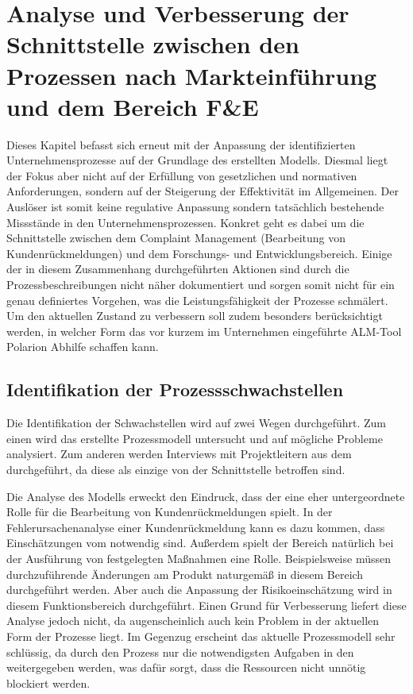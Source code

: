 \documentclass[a4paper,12pt]{report}
\begin{document}
\chapter{Analyse und Verbesserung der Schnittstelle zwischen den Prozessen nach Markteinführung und dem Bereich F\&E}\label{chap:Schnittstelle}
Dieses Kapitel befasst sich erneut mit der Anpassung der identifizierten Unternehmensprozesse auf der Grundlage des erstellten Modells. Diesmal liegt der Fokus aber nicht auf der Erfüllung von gesetzlichen und normativen Anforderungen, sondern auf der Steigerung der Effektivität im Allgemeinen. Der Auslöser ist somit keine regulative Anpassung sondern tatsächlich bestehende Missstände in den Unternehmensprozessen. Konkret geht es dabei um die Schnittstelle zwischen dem Complaint Management (Bearbeitung von Kundenrückmeldungen) und dem Forschungs- und Entwicklungsbereich. Einige der in diesem Zusammenhang durchgeführten Aktionen sind durch die Prozessbeschreibungen nicht näher dokumentiert und sorgen somit nicht für ein genau definiertes Vorgehen, was die Leistungsfähigkeit der Prozesse schmälert. Um den aktuellen Zustand zu verbessern soll zudem besonders berücksichtigt werden, in welcher Form das vor kurzem im Unternehmen eingeführte ALM-Tool Polarion Abhilfe schaffen kann.
\section{Identifikation der Prozessschwachstellen}\label{sec:Identifikation}
Die Identifikation der Schwachstellen wird auf zwei Wegen durchgeführt. Zum einen wird das erstellte Prozessmodell untersucht und auf mögliche Probleme analysiert. Zum anderen werden Interviews mit Projektleitern aus dem \FE durchgeführt, da diese als einzige von der Schnittstelle betroffen sind.

Die Analyse des Modells erweckt den Eindruck, dass der \FE eine eher untergeordnete Rolle für die Bearbeitung von Kundenrückmeldungen spielt. In der Fehlerursachenanalyse einer Kundenrückmeldung kann es dazu kommen, dass Einschätzungen vom \FE notwendig sind. Außerdem spielt der Bereich natürlich bei der Ausführung von festgelegten Maßnahmen eine Rolle. Beispielsweise müssen durchzuführende Änderungen am Produkt naturgemäß in diesem Bereich durchgeführt werden. Aber auch die Anpassung der Risikoeinschätzung wird in diesem Funktionsbereich durchgeführt. Einen Grund für Verbesserung liefert diese Analyse jedoch nicht, da augenscheinlich auch kein Problem in der aktuellen Form der Prozesse liegt. Im Gegenzug erscheint das aktuelle Prozessmodell sehr schlüssig, da durch den Prozess nur die notwendigsten Aufgaben in den \FE weitergegeben werden, was dafür sorgt, dass die Ressourcen nicht unnötig blockiert werden.
\end{document}
